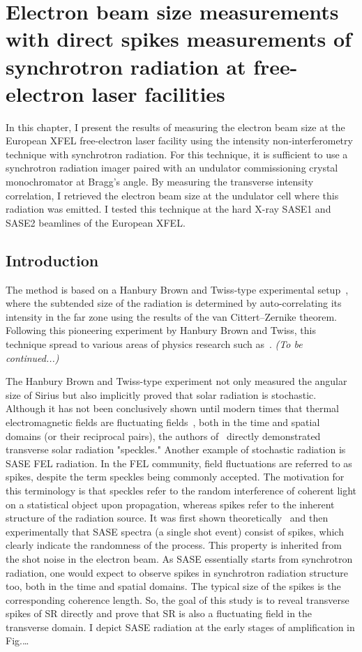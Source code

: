 \chapter{Electron beam size measurements with
direct spikes measurements of synchrotron radiation at free-electron laser facilities}
\label{chapter:CUCTUS}

    In this chapter, I present the results of measuring the electron beam size at the European XFEL free-electron laser facility using the intensity non-interferometry technique with synchrotron radiation. For this technique, it is sufficient to use a synchrotron radiation imager paired with an undulator commissioning crystal monochromator at Bragg's angle. By measuring the transverse intensity correlation, I retrieved the electron beam size at the undulator cell where this radiation was emitted. I tested this technique at the hard X-ray SASE1 and SASE2 beamlines of the European XFEL.

\section{Introduction}

    The method is based on a Hanbury Brown and Twiss-type experimental setup~\cite{cite}, where the subtended size of the radiation is determined by auto-correlating its intensity in the far zone using the results of the van Cittert–Zernike theorem. Following this pioneering experiment by Hanbury Brown and Twiss, this technique spread to various areas of physics research such as~\cite{cite it from Singer's work}. \textit{(To be continued...)}
    
    The Hanbury Brown and Twiss-type experiment not only measured the angular size of Sirius but also implicitly proved that solar radiation is stochastic. Although it has not been conclusively shown until modern times that thermal electromagnetic fields are fluctuating fields~\cite{cite}, both in the time and spatial domains (or their reciprocal pairs), the authors of~\cite{cite} directly demonstrated transverse solar radiation "speckles." Another example of stochastic radiation is SASE FEL radiation. In the FEL community, field fluctuations are referred to as spikes, despite the term speckles being commonly accepted. The motivation for this terminology is that speckles refer to the random interference of coherent light on a statistical object upon propagation, whereas spikes refer to the inherent structure of the radiation source. It was first shown theoretically~\cite{cite} and then experimentally that SASE spectra (a single shot event) consist of spikes, which clearly indicate the randomness of the process. This property is inherited from the shot noise in the electron beam. As SASE essentially starts from synchrotron radiation, one would expect to observe spikes in synchrotron radiation structure too, both in the time and spatial domains. The typical size of the spikes is the corresponding coherence length. So, the goal of this study is to reveal transverse spikes of SR directly and prove that SR is also a fluctuating field in the transverse domain. I depict SASE radiation at the early stages of amplification in Fig.…
    
